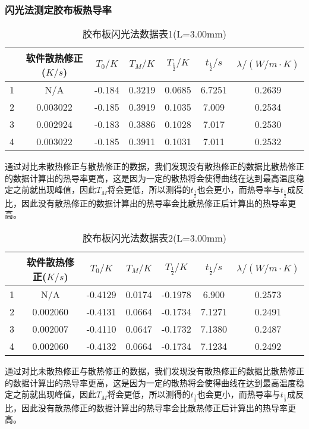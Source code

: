 \documentclass[UTF8]{ctexart}
\begin{document}
	\subsubsection{闪光法测定胶布板热导率}
	\begin{table}[H]
		\centering
		\caption{胶布板闪光法数据表1(L=3.00mm)}
		\begin{tabular}{|c|*{6}{c}|}
			\toprule[0.5mm]
			&软件散热修正($K/s$)&$T_{0}/K$&$T_{M}/K$&$T_{\frac{1}{2}}/K$&$t_{\frac{1}{2}}/s$&$\lambda/(W/m\cdot K)$\\
			\midrule
			1&N/A&-0.184&0.3219&0.0685&6.7251&0.2639\\
			2&0.003022&-0.185&0.3919&0.1035&7.009&0.2534\\
			3&0.002924&-0.183&0.3886&0.1028&7.017&0.2530\\
			4&0.003022&-0.185&0.3911&0.1031&7.011&0.2532\\
			\bottomrule[0.5mm]
		\end{tabular}
	\end{table}
\par 通过对比未散热修正与散热修正的数据，我们发现没有散热修正的数据比散热修正的数据计算出的热导率更高，这是因为一定的散热将会使得曲线在达到最高温度稳定之前就出现峰值，因此$T_{M}$将会更低，所以测得的$t_{\frac{1}{2}}$也会更小，而热导率与$t_{\frac{1}{2}}$成反比，因此没有散热修正的数据计算出的热导率会比散热修正后计算出的热导率更高。
	\begin{table}[H]
	\centering
	\caption{胶布板闪光法数据表2(L=3.00mm)}
	\begin{tabular}{|c|*{6}{c}|}
		\toprule[0.5mm]
		&软件散热修正($K/s$)&$T_{0}/K$&$T_{M}/K$&$T_{\frac{1}{2}}/K$&$t_{\frac{1}{2}}/s$&$\lambda/(W/m\cdot K)$\\
		\midrule
		1&N/A&-0.4129&0.0174&-0.1978&6.900&0.2573\\
		2&0.002060&-0.4131&0.0664&-0.1734&7.1271&0.2491\\
		3&0.002007&-0.4110&0.0647&-0.1732&7.1380&0.2487\\
		4&0.002060&-0.4132&0.0664&-0.1734&7.1234&0.2492\\
		\bottomrule[0.5mm]
	\end{tabular}
    \end{table}
\par 通过对比未散热修正与散热修正的数据，我们发现没有散热修正的数据比散热修正的数据计算出的热导率更高，这是因为一定的散热将会使得曲线在达到最高温度稳定之前就出现峰值，因此$T_{M}$将会更低，所以测得的$t_{\frac{1}{2}}$也会更小，而热导率与$t_{\frac{1}{2}}$成反比，因此没有散热修正的数据计算出的热导率会比散热修正后计算出的热导率更高。
\end{document}
